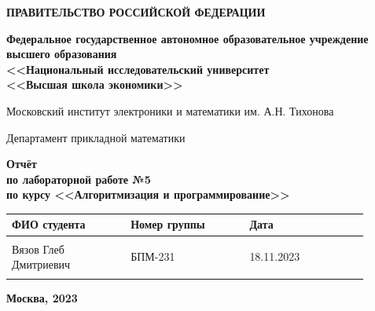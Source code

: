 \documentclass[12pt]{article}
\begin{document}
\thispagestyle{empty}
\begin{center}
\textbf{ПРАВИТЕЛЬСТВО РОССИЙСКОЙ ФЕДЕРАЦИИ}

\vspace{5ex}
	
\textbf{Федеральное государственное автономное образовательное учреждение \\ высшего образования \\ <<Национальный исследовательский университет \\ <<Высшая школа экономики>>}
\end{center}
\vspace{5ex}

\begin{center}
    Московский институт электроники и математики им. А.Н. Тихонова  
    
    \vspace{5ex}
    
    Департамент прикладной математики
    
    \vspace{10ex}
    \textbf{Отчёт \\ по лабораторной работе №5 \\ по курсу <<Алгоритмизация и программирование>>}
	\vspace{7ex}

\end{center}

\begin{center} 
\begin{tabular}{| p{0.3\linewidth}| p{0.3\linewidth}| p{0.3\linewidth}|}
 \hline	
ФИО студента & Номер группы & Дата \\  \hline
 & & \\  
Вязов Глеб \newline Дмитриевич & БПМ-231 & 18.11.2023\\  
 & & \\  \hline		
\end{tabular}
\end{center}

\begin{center}
	\vspace{3ex}
	
	\vfill
   
   \normalsize
    
	\textbf{Москва, 2023}
\end{center}

\newpage

\end{document}
